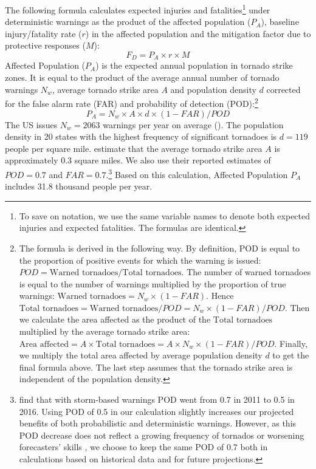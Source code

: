 \documentclass{ametsocV6.1}
\begin{document}
The following formula calculates expected injuries and fatalities\footnote{To save on notation, we use the same variable names to denote both expected injuries and expected fatalities. The formulas are identical.} under deterministic warnings as the product of the affected population ($P_A$), baseline injury/fatality rate ($r$) in the affected population and the mitigation factor due to protective responses ($M$):
$$F_D=P_A \times r \times M$$
Affected Population ($P_A$) is the expected annual population in tornado strike zones. It is equal to the product of the average annual number of tornado warnings $N_w$, average tornado strike area $A$ and population density $d$ corrected for the false alarm rate (FAR) and probability of detection (POD):\footnote{The formula is derived in the following way. By definition, POD is equal to the proportion of positive events for which the warning is issued: $POD=\mbox{Warned tornadoes}/\mbox{Total tornadoes}$. The number of warned tornadoes is equal to the number of warnings multiplied by the proportion of true warnings: $\mbox{Warned tornadoes}=N_w \times (1-FAR)$. Hence $\mbox{Total tornadoes} = \mbox{Warned tornadoes}/POD=N_w \times (1-FAR)/POD$. Then we calculate the area affected as the product of the $\mbox{Total tornadoes}$ multiplied by the average tornado strike area: $\mbox{Area affected} =A\times \mbox{Total tornadoes} = A \times N_w \times (1-FAR)/POD$. Finally, we multiply the total area affected by average population density $d$ to get the final formula above. The last step assumes that the tornado strike area is independent of the population density.}
$$P_A= N_w \times A \times d \times (1-FAR)/POD$$
The US issues $N_w=2063$ warnings per year on average (\citet{howard_firm_2021}). The population density in 20 states with the highest frequency of significant tornadoes is $d=119$ people per square mile. \citet{simmons_economic_2013} estimate that the average tornado strike area $A$ is approximately 0.3 square miles. We also use their reported estimates of $POD=0.7$ and $FAR=0.7$.\footnote{\citet{brooks_long-term_2018} find that with storm-based warnings POD went from 0.7 in 2011 to 0.5 in 2016. Using POD of 0.5 in our calculation slightly increases our projected benefits of both probabilistic and deterministic warnings. However, as this POD decrease does not reflect a growing frequency of tornados or worsening forecasters' skills \citep{brooks_long-term_2018}, we choose to keep the same POD of 0.7 both in calculations based on historical data and for future projections.} Based on this calculation, Affected Population $P_A$ includes 31.8 thousand people per year. 
\end{document}
